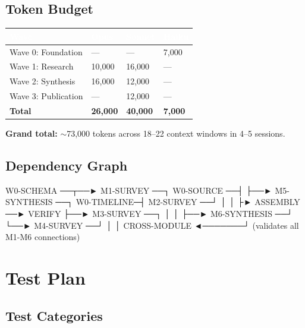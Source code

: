 \documentclass[11pt,letterpaper]{article}
\newcommand{\tableheader}[1]{\textbf{\sffamily\textcolor{white}{#1}}}
\begin{document}
\subsection{Token Budget}

\begin{center}
\begin{tabularx}{\textwidth}{L{4cm}C{2cm}C{2cm}C{2cm}}
\toprule
{}
\tableheader{Wave} & \tableheader{Opus} & \tableheader{Sonnet} & \tableheader{Haiku} \\
\midrule
Wave 0: Foundation & --- & --- & 7,000 \\
Wave 1: Research & 10,000 & 16,000 & --- \\
Wave 2: Synthesis & 16,000 & 12,000 & --- \\
Wave 3: Publication & --- & 12,000 & --- \\
\midrule
\textbf{Total} & \textbf{26,000} & \textbf{40,000} & \textbf{7,000} \\
\bottomrule
\end{tabularx}
\end{center}

\textbf{Grand total:} $\sim$73,000 tokens across 18--22 context windows in 4--5 sessions.

\subsection{Dependency Graph}

\begin{asciibox}
    W0-SCHEMA ──┬──► M1-SURVEY ──┐
    W0-SOURCE ──┤                ├──► M5-SYNTHESIS ──┐
    W0-TIMELINE─┤   M2-SURVEY ──┘                   │
                │                                     ├► ASSEMBLY ──► VERIFY
                ├──► M3-SURVEY ──┐                   │
                │                ├──► M6-SYNTHESIS ──┘
                └──► M4-SURVEY ──┘        │
                                          │
                     CROSS-MODULE ◄───────┘
                     (validates all M1-M6 connections)
\end{asciibox}

\section{Test Plan}

\subsection{Test Categories}
\end{document}
